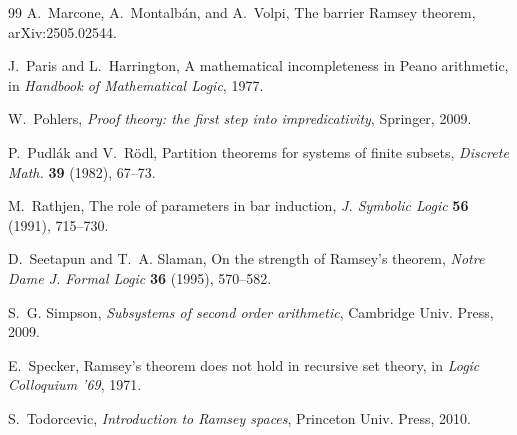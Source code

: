 \documentclass[11pt]{amsart}
\theoremstyle{definition}
\theoremstyle{remark}
\theoremstyle{plain}
\begin{document}
\begin{thebibliography}{99}
A.~Marcone, A.~Montalb\'an, and A.~Volpi,
\newblock The barrier Ramsey theorem,
\newblock arXiv:2505.02544.


J.~Paris and L.~Harrington,
\newblock A mathematical incompleteness in Peano arithmetic,
\newblock in \emph{Handbook of Mathematical Logic}, 1977.

W.~Pohlers,
\newblock \emph{Proof theory: the first step into impredicativity},
\newblock Springer, 2009.


P.~Pudl{\'a}k and V.~R{\"o}dl,
\newblock Partition theorems for systems of finite subsets,
\newblock \emph{Discrete Math.} \textbf{39} (1982), 67--73.

M.~Rathjen,
\newblock The role of parameters in bar induction,
\newblock \emph{J. Symbolic Logic} \textbf{56} (1991), 715--730.

D.~Seetapun and T.~A. Slaman,
\newblock On the strength of Ramsey's theorem,
\newblock \emph{Notre Dame J. Formal Logic} \textbf{36} (1995), 570--582.

S.~G. Simpson,
\newblock \emph{Subsystems of second order arithmetic},
\newblock Cambridge Univ. Press, 2009.

E.~Specker,
\newblock Ramsey's theorem does not hold in recursive set theory,
\newblock in \emph{Logic Colloquium '69}, 1971.

S.~Todorcevic,
\newblock \emph{Introduction to Ramsey spaces},
\newblock Princeton Univ. Press, 2010.

\end{thebibliography}
\end{document}
